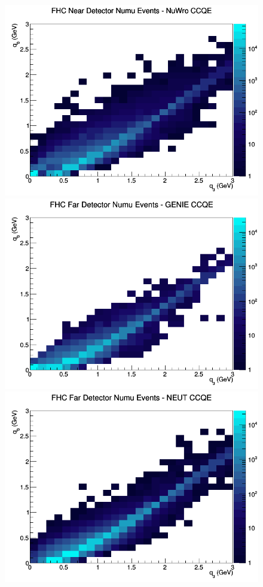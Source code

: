 \documentclass[12pt]{article}
\begin{document}
\begin{figure}[h]
\includegraphics[width=\linewidth]{eff_q0_q3/FGT/CCQE_FHC_ND_numu_q3_q0_NuWro.png}
\endminipage
\newline
{}
\includegraphics[width=\linewidth]{eff_q0_q3/FGT/CCQE_FHC_FD_numu_q3_q0_GENIE.png}
\endminipage
{}
\includegraphics[width=\linewidth]{eff_q0_q3/FGT/CCQE_FHC_FD_numu_q3_q0_NEUT.png}

\end{figure}
\end{document}
